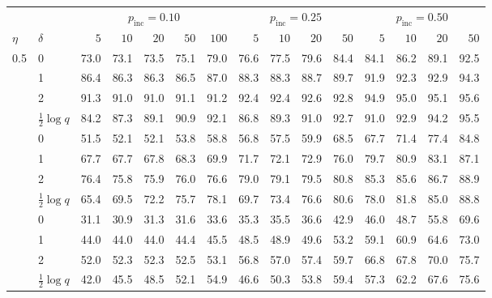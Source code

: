 \begin{tabular}{llrrrrrrrrrrrrr}
\toprule
 & & \multicolumn{5}{c}{$p_{\mathrm{inc}}=0.10$} & \multicolumn{4}{c}{$p_{\mathrm{inc}}=0.25$} & \multicolumn{4}{c}{$p_{\mathrm{inc}}=0.50$} \\
\cmidrule(lr){3-7}\cmidrule(lr){8-11}\cmidrule(lr){12-15}
$\eta$ & $\delta$ & $5$ & $10$ & $20$ & $50$ & $100$ & $5$ & $10$ & $20$ & $50$ & $5$ & $10$ & $20$ & $50$ \\
\midrule
0.5 & 0 & 73.0 & 73.1 & 73.5 & 75.1 & 79.0 & 76.6 & 77.5 & 79.6 & 84.4 & 84.1 & 86.2 & 89.1 & 92.5 \\
 & 1 & 86.4 & 86.3 & 86.3 & 86.5 & 87.0 & 88.3 & 88.3 & 88.7 & 89.7 & 91.9 & 92.3 & 92.9 & 94.3 \\
 & 2 & 91.3 & 91.0 & 91.0 & 91.1 & 91.2 & 92.4 & 92.4 & 92.6 & 92.8 & 94.9 & 95.0 & 95.1 & 95.6 \\
 & $\tfrac12\log q$ & 84.2 & 87.3 & 89.1 & 90.9 & 92.1 & 86.8 & 89.3 & 91.0 & 92.7 & 91.0 & 92.9 & 94.2 & 95.5 \\
\addlinespace
1 & 0 & 51.5 & 52.1 & 52.1 & 53.8 & 58.8 & 56.8 & 57.5 & 59.9 & 68.5 & 67.7 & 71.4 & 77.4 & 84.8 \\
 & 1 & 67.7 & 67.7 & 67.8 & 68.3 & 69.9 & 71.7 & 72.1 & 72.9 & 76.0 & 79.7 & 80.9 & 83.1 & 87.1 \\
 & 2 & 76.4 & 75.8 & 75.9 & 76.0 & 76.6 & 79.0 & 79.1 & 79.5 & 80.8 & 85.3 & 85.6 & 86.7 & 88.9 \\
 & $\tfrac12\log q$ & 65.4 & 69.5 & 72.2 & 75.7 & 78.1 & 69.7 & 73.4 & 76.6 & 80.6 & 78.0 & 81.8 & 85.0 & 88.8 \\
\addlinespace
2 & 0 & 31.1 & 30.9 & 31.3 & 31.6 & 33.6 & 35.3 & 35.5 & 36.6 & 42.9 & 46.0 & 48.7 & 55.8 & 69.6 \\
 & 1 & 44.0 & 44.0 & 44.0 & 44.4 & 45.5 & 48.5 & 48.9 & 49.6 & 53.2 & 59.1 & 60.9 & 64.6 & 73.0 \\
 & 2 & 52.0 & 52.3 & 52.3 & 52.5 & 53.1 & 56.8 & 57.0 & 57.4 & 59.7 & 66.8 & 67.8 & 70.0 & 75.7 \\
 & $\tfrac12\log q$ & 42.0 & 45.5 & 48.5 & 52.1 & 54.9 & 46.6 & 50.3 & 53.8 & 59.4 & 57.3 & 62.2 & 67.6 & 75.6 \\
\bottomrule
\end{tabular}
